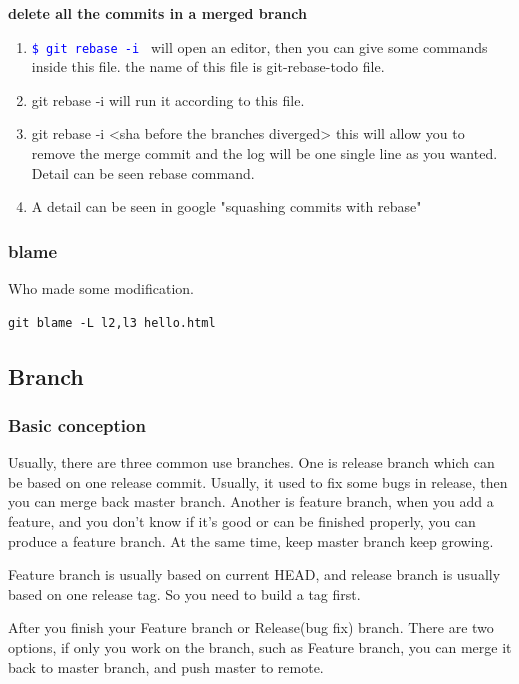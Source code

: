 \documentclass[paper=8.5in:11in, twoside, 12pt, pagesize=pdftex]{book}
\newcommand{\linuxcommand}[1]{\texttt{\textcolor{blue}{\$ #1 \Pisymbol{psy}{191}}}}
\begin{document}
	\textbf{delete all the commits in a merged branch}
	\begin{enumerate}
		\item \linuxcommand{git rebase -i} will open an editor, then you can give some commands inside this file. the name of this file is git-rebase-todo file.
		
		\item git rebase -i will run it according to this file. 
		
		\item git rebase -i <sha before the branches diverged> this will allow you to remove the merge commit and the log will be one single line as you wanted.  Detail can be seen rebase command. 
		
		\item A detail can be seen in google "squashing commits with rebase"
		
	\end{enumerate}
	
\subsubsection{blame}
Who made some modification. 
\begin{lstlisting}
git blame -L l2,l3 hello.html
\end{lstlisting}


\subsection{Branch}
\subsubsection{Basic conception}

	Usually, there are three common use branches. One is release branch which can be based on one release commit. Usually, it used to fix some bugs in release, then you can merge back master branch. Another is feature branch, when you add a feature, and you don't know if it's good or can be finished properly, you can produce a feature branch. At the same time, keep master branch keep growing.
	
	Feature branch is usually based on current HEAD,  and release branch is usually based on one release tag.  So you need to build a tag first.
	
	After you finish your Feature branch or Release(bug fix) branch. There are two options, if only you work on the branch, such as Feature branch, you can merge it back to master branch, and push master to remote. 
	
\end{document}
